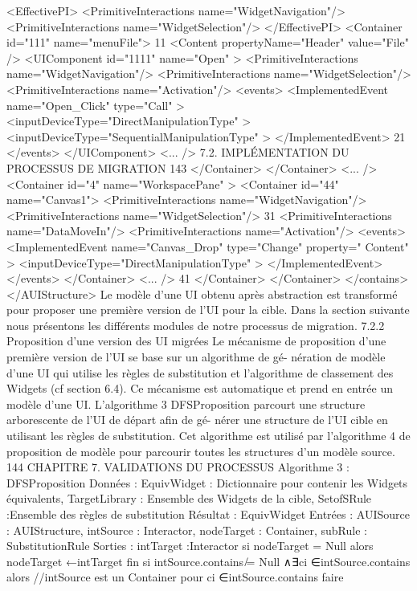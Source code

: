 \documentclass{article}
\begin{document}
<EffectivePI>
<PrimitiveInteractions name="WidgetNavigation"/>
<PrimitiveInteractions name="WidgetSelection"/>
</EffectivePI>
<Container id="111" name="menuFile">
11
<Content propertyName="Header" value="File" />
<UIComponent id="1111" name="Open" >
<PrimitiveInteractions name="WidgetNavigation"/>
<PrimitiveInteractions name="WidgetSelection"/>
<PrimitiveInteractions name="Activation"/>
<events>
<ImplementedEvent name="Open_Click" type="Call" >
<inputDeviceType="DirectManipulationType" >
<inputDeviceType="SequentialManipulationType" >
</ImplementedEvent>
21
</events>
</UIComponent>
<... />
7.2. IMPLÉMENTATION DU PROCESSUS DE MIGRATION
143
</Container>
</Container>
<... />
<Container id="4" name="WorkspacePane" >
<Container id="44" name="Canvas1">
<PrimitiveInteractions name="WidgetNavigation"/>
<PrimitiveInteractions name="WidgetSelection"/>
31
<PrimitiveInteractions name="DataMoveIn"/>
<PrimitiveInteractions name="Activation"/>
<events>
<ImplementedEvent name="Canvas_Drop" type="Change" property="
Content" >
<inputDeviceType="DirectManipulationType" >
</ImplementedEvent>
</events>
</Container>
<... />
41
</Container>
</Container>
</contains>
</AUIStructure>
Le modèle d’une UI obtenu après abstraction est transformé pour proposer une première version de
l’UI pour la cible. Dans la section suivante nous présentons les différents modules de notre processus
de migration.
7.2.2
Proposition d’une version des UI migrées
Le mécanisme de proposition d’une première version de l’UI se base sur un algorithme de gé-
nération de modèle d’une UI qui utilise les règles de substitution et l’algorithme de classement des
Widgets (cf section 6.4). Ce mécanisme est automatique et prend en entrée un modèle d’une UI.
L’algorithme 3 DFSProposition parcourt une structure arborescente de l’UI de départ aﬁn de gé-
nérer une structure de l’UI cible en utilisant les règles de substitution. Cet algorithme est utilisé par
l’algorithme 4 de proposition de modèle pour parcourir toutes les structures d’un modèle source.
144
CHAPITRE 7. VALIDATIONS DU PROCESSUS
Algorithme 3 : DFSProposition
Données : EquivWidget : Dictionnaire pour contenir les Widgets équivalents, TargetLibrary :
Ensemble des Widgets de la cible, SetofSRule :Ensemble des règles de substitution
Résultat : EquivWidget
Entrées : AUISource : AUIStructure, intSource : Interactor, nodeTarget : Container, subRule :
SubstitutionRule
Sorties : intTarget :Interactor
si nodeTarget = Null alors
nodeTarget ←intTarget
ﬁn
si intSource.contains ̸= Null ∧∃ci ∈intSource.contains alors
//intSource est un Container
pour ci ∈intSource.contains faire
\end{document}
